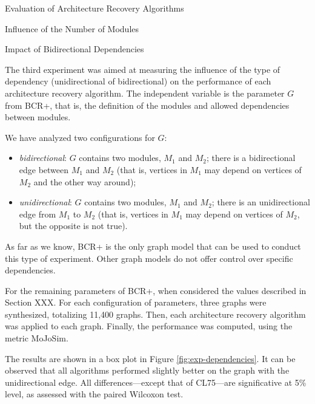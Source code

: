 \documentclass[11pt,twocolumn,a4paper,english]{article}
\begin{document}
\begin{section}{Evaluation of Architecture Recovery Algorithms}
\begin{subsection}{Influence of the Number of Modules}
\end{subsection}

\begin{subsection}{Impact of Bidirectional Dependencies} \label{sec:exp3}
	
	The third experiment was aimed at measuring the influence of the type of dependency (unidirectional of bidirectional) on the performance of each architecture recovery algorithm. The independent variable is the parameter $G$ from BCR+, that is, the definition of the modules and allowed dependencies between modules.
	
	We have analyzed two configurations for $G$:
	
	\begin{itemize}
		\item \emph{bidirectional}: $G$ contains two modules, $M_1$ and $M_2$; there is a bidirectional edge between $M_1$ and $M_2$ (that is, vertices in $M_1$ may depend on vertices of $M_2$ and the other way around);
		
		\item \emph{unidirectional}: $G$ contains two modules, $M_1$ and $M_2$; there is an unidirectional edge from $M_1$ to $M_2$ (that is, vertices in $M_1$ may depend on vertices of $M_2$, but the opposite is not true).
	\end{itemize}
	
	As far as we know, BCR+ is the only graph model that can be used to conduct this type of experiment. Other graph models do not offer control over specific dependencies.
	
	For the remaining parameters of BCR+, when considered the values described in Section XXX. For each configuration of parameters, three graphs were synthesized, totalizing 11,400 graphs. Then, each architecture recovery algorithm was applied to each graph. Finally, the performance was computed, using the metric MoJoSim.
	
	The results are shown in a box plot in Figure \ref{fig:exp-dependencies}. It can be observed that all algorithms performed slightly better on the graph with the unidirectional edge. All differences---except that of CL75---are significative at 5\% level, as assessed with the paired Wilcoxon test.
	

\end{subsection}
\end{section}
\end{document}
